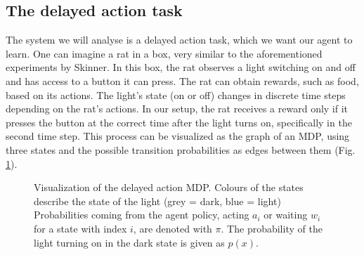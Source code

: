 \documentclass[12pt,a4paper]{article}
\begin{document}
\subsection{The delayed action task} \label{ssec:delayed_action_mdp}
The system we will analyse is a delayed action task, which we want our agent to learn.
One can imagine a rat in a box, very similar to the aforementioned experiments by Skinner.
In this box, the rat observes a light switching on and off and has access to a button it can press.
The rat can obtain rewards, such as food, based on its actions. The light's state (on or off) changes in discrete time steps depending on the rat's actions.
In our setup, the rat receives a reward only if it presses the button at the correct time after the light turns on, specifically in the second time step.
This process can be visualized as the graph of an MDP, using three states and the possible transition probabilities as edges between them (Fig. \ref{fig:delayed_mdp}).

\begin{figure}[H]
    \centering
    \caption{\label{fig:delayed_mdp} Visualization of the delayed action MDP. Colours of the states describe the state of the light (grey = dark, blue = light) Probabilities coming from the agent policy, acting $a_i$ or waiting $w_i$ for a state with index $i$, are denoted with $\pi$. The probability of the light turning on in the dark state is given as $p(x)$.}
\end{figure}
\end{document}
